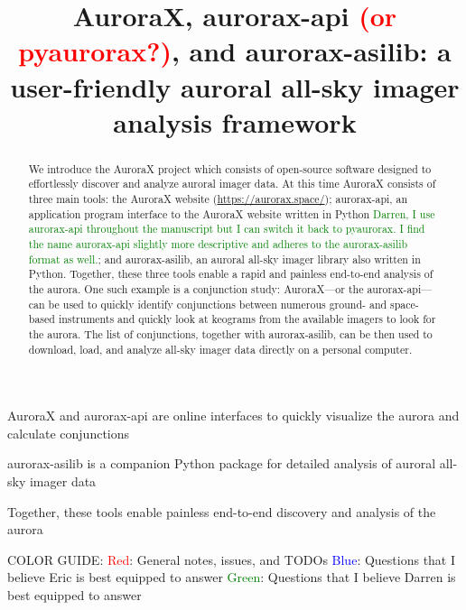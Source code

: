 \documentclass[draft]{agujournal2019}
\begin{document}
\title{AuroraX, aurorax-api \textcolor{red}{(or pyaurorax?)}, and aurorax-asilib: a user-friendly auroral all-sky imager analysis framework}





\begin{keypoints}
\item AuroraX and aurorax-api are online interfaces to quickly visualize the aurora and calculate conjunctions
\item aurorax-asilib is a companion Python package for detailed analysis of auroral all-sky imager data 
\item Together, these tools enable painless end-to-end discovery and analysis of the aurora
\end{keypoints}

COLOR GUIDE: \newline
\textcolor{red}{Red}: General notes, issues, and TODOs \newline
\textcolor{blue}{Blue}: Questions that I believe Eric is best equipped to answer \newline
\textcolor{green}{Green}: Questions that I believe Darren is best equipped to answer

\begin{abstract}
We introduce the AuroraX project which consists of open-source software designed to effortlessly discover and analyze auroral imager data. At this time AuroraX consists of three main tools: the AuroraX website (\url{https://aurorax.space/}); aurorax-api, an application program interface to the AuroraX website written in Python \textcolor{green}{Darren, I use aurorax-api throughout the manuscript but I can switch it back to pyaurorax. I find the name aurorax-api slightly more descriptive and adheres to the aurorax-asilib format as well.}; and aurorax-asilib, an auroral all-sky imager library also written in Python. Together, these three tools enable a rapid and painless end-to-end analysis of the aurora. One such example is a conjunction study: AuroraX---or the aurorax-api---can be used to quickly identify conjunctions between numerous ground- and space-based instruments and quickly look at keograms from the available imagers to look for the aurora. The list of conjunctions, together with aurorax-asilib, can be then used to download, load, and analyze all-sky imager data directly on a personal computer.
\end{abstract}
\end{document}
